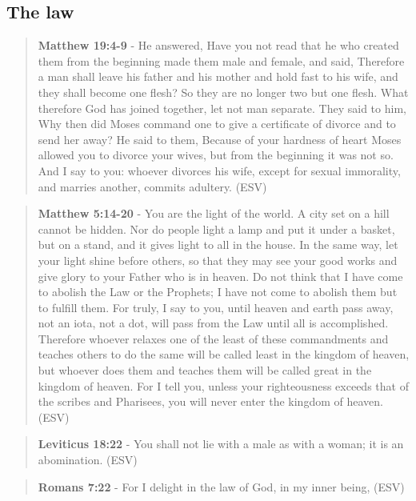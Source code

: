 \documentclass[11pt]{article}
\begin{document}
\subsection{The law}
\label{sec:orgd377f00}

\begin{quote}
\textbf{Matthew 19:4-9} - He answered, Have you not read that he who created them from the beginning made them male and female, and said, Therefore a man shall leave his father and his mother and hold fast to his wife, and they shall become one flesh? So they are no longer two but one flesh. What therefore God has joined together, let not man separate. They said to him, Why then did Moses command one to give a certificate of divorce and to send her away? He said to them, Because of your hardness of heart Moses allowed you to divorce your wives, but from the beginning it was not so. And I say to you: whoever divorces his wife, except for sexual immorality, and marries another, commits adultery. (ESV)
\end{quote}

\begin{quote}
\textbf{Matthew 5:14-20} - You are the light of the world. A city set on a hill cannot be hidden. Nor do people light a lamp and put it under a basket, but on a stand, and it gives light to all in the house. In the same way, let your light shine before others, so that they may see your good works and give glory to your Father who is in heaven. Do not think that I have come to abolish the Law or the Prophets; I have not come to abolish them but to fulfill them. For truly, I say to you, until heaven and earth pass away, not an iota, not a dot, will pass from the Law until all is accomplished. Therefore whoever relaxes one of the least of these commandments and teaches others to do the same will be called least in the kingdom of heaven, but whoever does them and teaches them will be called great in the kingdom of heaven. For I tell you, unless your righteousness exceeds that of the scribes and Pharisees, you will never enter the kingdom of heaven. (ESV)
\end{quote}

\begin{quote}
\textbf{Leviticus 18:22} - You shall not lie with a male as with a woman; it is an abomination. (ESV)
\end{quote}

\begin{quote}
\textbf{Romans 7:22} - For I delight in the law of God, in my inner being, (ESV)
\end{quote}
\end{document}
